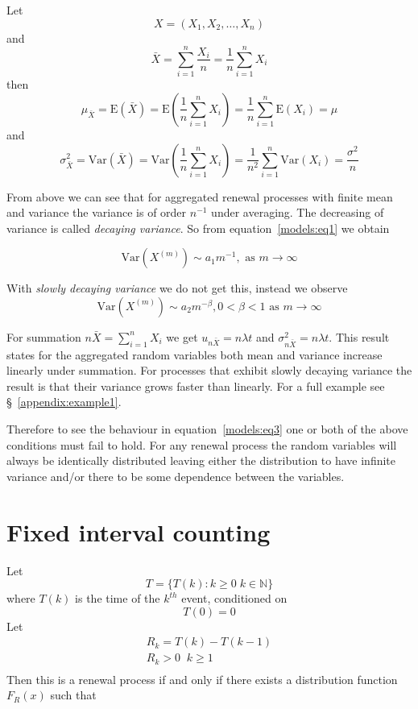 Let
\[
X = (X_1,X_2,\dots,X_n)
\]
and
\[
{\bar X} = \sum^n_{i=1}\frac{X_i}{n} = \frac{1}{n}\sum^n_{i=1}X_i
\]
then
\[
\mu_{\bar X} = \mbox{E}({\bar X}) = \mbox{E}( \frac{1}{n}\sum^n_{i=1}X_i)
= \frac{1}{n}\sum^n_{i=1}\mbox{E}(X_i) = \mu
\]
and
\[
\sigma^2_{\bar X} = \mbox{Var}({\bar X}) = \mbox{Var}(\frac{1}{n}\sum^n_{i=1}X_i) = \frac{1}{n^2}\sum^n_{i=1}\mbox{Var}(X_i) = \frac{\sigma^2}{n}
\]

From above we can see that for aggregated renewal processes with finite
mean and variance the variance is of order $n^{-1}$ under
averaging.  The decreasing of variance is called {\em decaying
variance}.  So from equation~\ref{models:eq1} we obtain

\begin{equation}
\mbox{Var}(X^{(m)}) \sim a_1 m^{-1}, \mbox{ as } m \rightarrow \infty
\end{equation}

With {\em slowly decaying variance} we do not get this, instead we observe
\begin{equation}
\mbox{Var}(X^{(m)}) \sim a_2 m^{-\beta}, 0 < \beta < 1 \mbox{ as } m \rightarrow \infty
\label{models:eq3}
\end{equation}

For summation $n{\bar X} = \sum^n_{i = 1}X_i$ we get $u_{n{\bar X}} = n
\lambda t$ and $\sigma^2_{n {\bar X}} = n \lambda t$.  This result
states for the aggregated random variables both mean and variance
increase linearly under summation.  For processes that exhibit slowly
decaying variance the result is that their variance grows faster than
linearly.  For a full example see \S~\ref{appendix:example1}.

Therefore to see the behaviour in equation~\ref{models:eq3} one or
both of the above conditions must fail to hold.  For any renewal
process the random variables will always be identically distributed
leaving either the distribution to have infinite variance and/or there
to be some dependence between the variables.

\section{Fixed interval counting}

Let
\[ T = \{T(k) : k \geq 0 \; k \in {\mathbb N} \} \]
where $T(k)$ is the time of the $k^{th}$ event, conditioned on
\[ T(0) = 0 \]
Let
\[ \begin{array}{c}
R_k = T(k) - T(k-1) \\
R_k > 0 \; \;  k \geq 1 \\
\end{array}
\]
Then this is a renewal process if and only if there exists a
distribution function $F_R(x)$ such that

